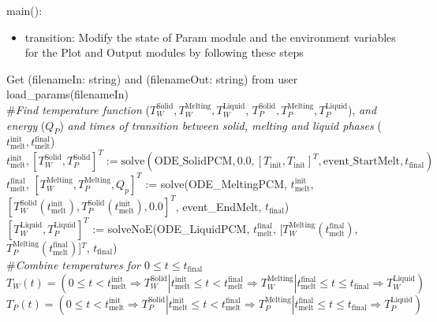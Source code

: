 \documentclass[12pt, titlepage]{article}
\begin{document}
\noindent main():
\begin{itemize}
\item transition: Modify the state of Param module and the environment variables
  for the Plot and Output modules by following these steps\\
\end{itemize}

\noindent Get (filenameIn: string) and (filenameOut: string) from user\\

\noindent load\_params(filenameIn)\\

\noindent \#\textit{Find temperature function} ($T_W^\text{Solid},
  T_W^\text{Melting}, T_W^\text{Liquid}$, $T_P^\text{Solid},
  T_P^\text{Melting}, T_P^\text{Liquid}$), \textit{and energy} ($Q_P$) \textit{and times of transition between solid,
  melting and liquid phases} ($t_\text{melt}^{\text{init}}, t_\text{melt}^{\text{final}}$)\\

\noindent $t_\text{melt}^\text{init}, [T_W^{\text{Solid}}, T_P^{\text{Solid}}]^T := \text{solve}(\text{ODE\_SolidPCM}, 0.0,
[T_\text{init}, T_\text{init}]^T, \text{event\_StartMelt} , t_\text{final})$\\

\noindent $t_\text{melt}^\text{final}$, $[T_W^{\text{Melting}},
T_P^{\text{Melting}}, Q_p]^T$ := solve(ODE\_MeltingPCM,
$t_\text{melt}^\text{init}$, $[T_W^{\text{Solid}}(t_\text{melt}^\text{init}),
  T_P^{\text{Solid}}(t_\text{melt}^\text{init}), 0.0]^T$,
  event\_EndMelt, $t_\text{final}$)\\

\noindent $[ T_W^{\text{Liquid}}, T_P^{\text{Liquid}}]^T$ := solveNoE(ODE\_LiquidPCM, $t_\text{melt}^\text{final}$,
[$T_W^{\text{Melting}}(t_\text{melt}^\text{final})$,
$T_P^{\text{Melting}}(t_\text{melt}^\text{final})$]$^T$, $t_\text{final}$)\\

\noindent \#\textit{Combine temperatures for $0 \leq t \leq t_\text{final}$}\\

\noindent $T_W(t) = (0 \leq t < t_\text{melt}^{\text{init}} \Rightarrow
T_W^{\text{Solid}} | t_\text{melt}^{\text{init}} \leq t <
t_\text{melt}^{\text{final}} \Rightarrow T_W^{\text{Melting}} |
t_\text{melt}^{\text{final}} \leq t \leq
t_\text{final} \Rightarrow T_W^{\text{Liquid}} )$\\

\noindent $T_P(t) = (0 \leq t < t_\text{melt}^{\text{init}} \Rightarrow
T_P^{\text{Solid}} | t_\text{melt}^{\text{init}} \leq t <
t_\text{melt}^{\text{final}} \Rightarrow T_P^{\text{Melting}} | t_\text{melt}^{\text{final}} \leq t \leq
t_\text{final} \Rightarrow T_P^{\text{Liquid}} )$\\
\end{document}

